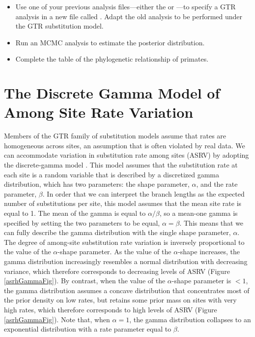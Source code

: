 \begin{itemize}
\item Use one of your previous analysis files---either the  or ---to specify a GTR analysis in a new file called .
	Adapt the old analysis to be performed under the GTR substitution model. 
\item Run an MCMC analysis to estimate the posterior distribution.
\item Complete the table of the phylogenetic relationship of primates.
\end{itemize}






\newpage
\section{The Discrete Gamma Model of Among Site Rate Variation}


Members of the GTR family of substitution models assume that rates are homogeneous across sites, an assumption that is often violated by real data.
We can accommodate variation in substitution rate among sites (ASRV) by adopting the discrete-gamma model \citep{Yang1994a}.
This model assumes that the substitution rate at each site is a random variable that is described by a discretized gamma distribution, which has two parameters: the shape parameter, $\alpha$, and the rate parameter, $\beta$. 
In order that we can interpret the branch lengths as the expected number of substitutions per site, this model assumes that the mean site rate is equal to 1.
The mean of the gamma is equal to $\alpha/\beta$, so a mean-one gamma is specified by setting the two parameters to be equal, $\alpha=\beta$.
This means that we can fully describe the gamma distribution with the single shape parameter, $\alpha$. 
The degree of among-site substitution rate variation is inversely proportional to the value of the $\alpha$-shape parameter.
As the value of the $\alpha$-shape increases, the gamma distribution increasingly resembles a normal distribution with decreasing variance, which therefore corresponds to decreasing levels of ASRV (Figure \ref{asrhGammaFig}).
By contrast, when the value of the $\alpha$-shape parameter is $< 1$, the gamma distribution assumes a concave distribution that concentrates most of the prior density on low rates, but retains some prior mass on sites with very high rates, which therefore corresponds to high levels of ASRV (Figure \ref{asrhGammaFig}).
Note that, when $\alpha = 1$, the gamma distribution collapses to an exponential distribution with a rate parameter equal to $\beta$.


